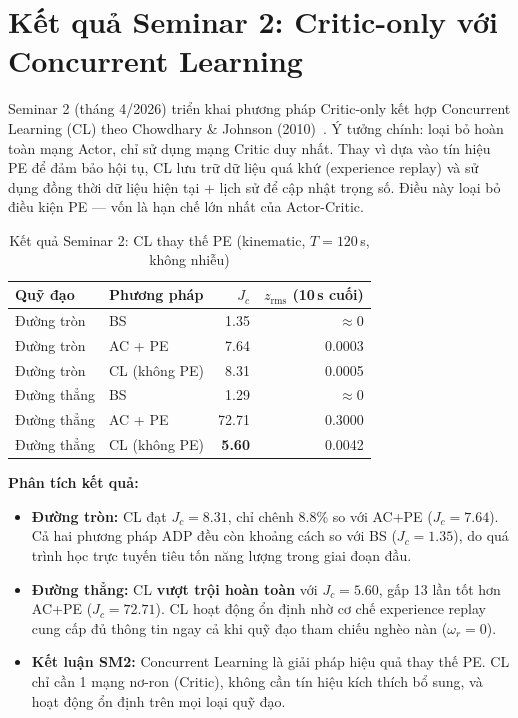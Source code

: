 \documentclass[12pt,a4paper]{article}
\begin{document}
\section{Kết quả Seminar 2: Critic-only với Concurrent Learning}

Seminar 2 (tháng 4/2026) triển khai phương pháp Critic-only kết hợp Concurrent Learning (CL) theo Chowdhary \& Johnson (2010)~\cite{Chowdhary2010}. Ý tưởng chính: loại bỏ hoàn toàn mạng Actor, chỉ sử dụng mạng Critic duy nhất. Thay vì dựa vào tín hiệu PE để đảm bảo hội tụ, CL lưu trữ dữ liệu quá khứ (experience replay) và sử dụng đồng thời dữ liệu hiện tại + lịch sử để cập nhật trọng số. Điều này loại bỏ điều kiện PE --- vốn là hạn chế lớn nhất của Actor-Critic.

\begin{table}[H]
\centering
\caption{Kết quả Seminar 2: CL thay thế PE (kinematic, $T=120$\,s, không nhiễu)}
\begin{tabular}{llrr}
\toprule
\textbf{Quỹ đạo} & \textbf{Phương pháp} & $J_c$ & $z_\text{rms}$ (10\,s cuối) \\
\midrule
Đường tròn & BS          & 1.35  & $\approx 0$ \\
Đường tròn & AC + PE     & 7.64  & 0.0003 \\
Đường tròn & CL (không PE)  & 8.31  & 0.0005 \\
\midrule
Đường thẳng & BS          & 1.29  & $\approx 0$ \\
Đường thẳng & AC + PE     & 72.71 & 0.3000 \\
Đường thẳng & CL (không PE)  & \textbf{5.60}  & 0.0042 \\
\bottomrule
\end{tabular}
\end{table}

\textbf{Phân tích kết quả:}
\begin{itemize}
    \item \textbf{Đường tròn:} CL đạt $J_c = 8.31$, chỉ chênh 8.8\% so với AC+PE ($J_c = 7.64$). Cả hai phương pháp ADP đều còn khoảng cách so với BS ($J_c = 1.35$), do quá trình học trực tuyến tiêu tốn năng lượng trong giai đoạn đầu.

    \item \textbf{Đường thẳng:} CL \textbf{vượt trội hoàn toàn} với $J_c = 5.60$, gấp 13 lần tốt hơn AC+PE ($J_c = 72.71$). CL hoạt động ổn định nhờ cơ chế experience replay cung cấp đủ thông tin ngay cả khi quỹ đạo tham chiếu nghèo nàn ($\omega_r = 0$).

    \item \textbf{Kết luận SM2:} Concurrent Learning là giải pháp hiệu quả thay thế PE. CL chỉ cần 1 mạng nơ-ron (Critic), không cần tín hiệu kích thích bổ sung, và hoạt động ổn định trên mọi loại quỹ đạo.
\end{itemize}
\end{document}
